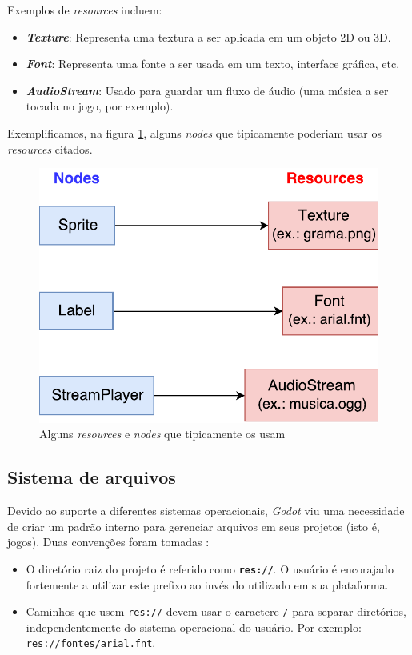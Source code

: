 Exemplos de \textit{resources} incluem:

\begin{itemize}
\item \textbf{\textit{Texture}}: Representa uma textura a ser aplicada em um objeto 2D ou 3D.

\item \textbf{\textit{Font}}: Representa uma fonte a ser usada em um texto, interface gráfica, etc.

\item \textbf{\textit{AudioStream}}: Usado para guardar um fluxo de áudio (uma música a ser tocada no jogo, por exemplo).
\end{itemize}

Exemplificamos, na figura \ref{nodeResource}, alguns \textit{nodes} que tipicamente poderiam usar os \textit{resources} citados.

\begin{figure}[H]
  \centering
  \includegraphics[width=.5\textwidth]{image/resource.pdf}
  \caption{Alguns \textit{resources} e \textit{nodes} que tipicamente os usam \citep{godotResource}}
  \label{nodeResource}
\end{figure}


\subsection{Sistema de arquivos}
\label{godotFileSystem}

Devido ao suporte a diferentes sistemas operacionais, \textit{Godot} viu uma necessidade de criar um padrão interno para gerenciar arquivos em seus projetos (isto é, jogos). Duas convenções foram tomadas \citep{godotFileSystem}:

\begin{itemize}
\item O diretório raiz do projeto é referido como \textbf{\texttt{res://}}. O usuário é encorajado fortemente a utilizar este prefixo ao invés do utilizado em sua plataforma.

\item Caminhos que usem \texttt{res://} devem usar o caractere \texttt{/} para separar diretórios, independentemente do sistema operacional do usuário. Por exemplo: \texttt{res://fontes/arial.fnt}.
\end{itemize}

